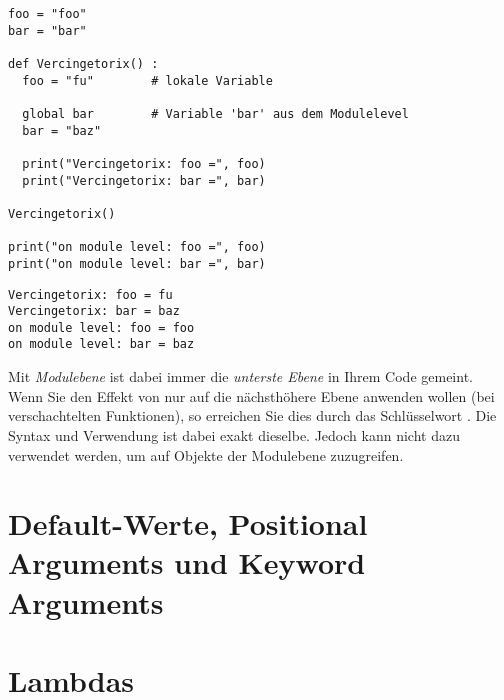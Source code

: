 \begin{codebox}
\begin{verbatim}
foo = "foo"
bar = "bar"

def Vercingetorix() :
  foo = "fu"        # lokale Variable
  
  global bar        # Variable 'bar' aus dem Modulelevel
  bar = "baz"

  print("Vercingetorix: foo =", foo)
  print("Vercingetorix: bar =", bar)

Vercingetorix()

print("on module level: foo =", foo)
print("on module level: bar =", bar)
\end{verbatim}
\end{codebox}
\begin{cmdbox}
\begin{verbatim}
Vercingetorix: foo = fu
Vercingetorix: bar = baz
on module level: foo = foo
on module level: bar = baz
\end{verbatim}
\end{cmdbox}

Mit \emph{Modulebene} ist dabei immer die \emph{unterste Ebene} in Ihrem Code gemeint. Wenn Sie den Effekt von  nur auf die nächsthöhere Ebene anwenden wollen (\eg bei verschachtelten Funktionen), so erreichen Sie dies durch das Schlüsselwort . Die Syntax und Verwendung ist dabei exakt dieselbe. Jedoch kann  nicht dazu verwendet werden, um auf Objekte der Modulebene zuzugreifen.

\section{Default-Werte, Positional Arguments und Keyword Arguments}


\section{Lambdas}

